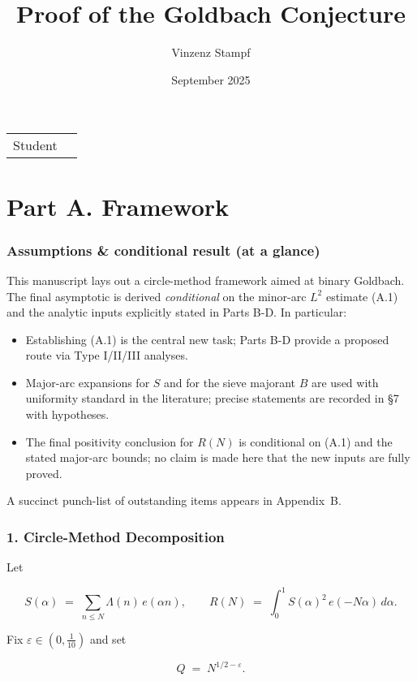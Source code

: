 \documentclass[11pt]{article}
\title{Proof of the Goldbach Conjecture}
\author{Vinzenz Stampf}
\date{September 2025}
\makeatletter
\theoremstyle{definition}
\theoremstyle{remark}
\providecommand{\theauthor}{\@author}
\makeatother
\begin{document}
\maketitle

\noindent\begin{tabular}{@{}ll}
    Student & \theauthor\\
\end{tabular}

\part*{Part A. Framework}

\section*{Assumptions \& conditional result (at a glance)}

This manuscript lays out a circle-method framework aimed at binary Goldbach. The final asymptotic is derived \emph{conditional} on the minor-arc $L^2$ estimate (A.1) and the analytic inputs explicitly stated in Parts B-D. In particular:

\begin{itemize}
  \item Establishing (A.1) is the central new task; Parts B-D provide a proposed route via Type I/II/III analyses.
  \item Major-arc expansions for $S$ and for the sieve majorant $B$ are used with uniformity standard in the literature; precise statements are recorded in §7 with hypotheses.
  \item The final positivity conclusion for $R(N)$ is conditional on (A.1) and the stated major-arc bounds; no claim is made here that the new inputs are fully proved.
\end{itemize}

A succinct punch-list of outstanding items appears in Appendix~B.

\section*{1. Circle-Method Decomposition}

Let

$$
S(\alpha)\;=\;\sum_{n\le N}\Lambda(n)\,e(\alpha n),\qquad
R(N)\;=\;\int_{0}^{1} S(\alpha)^2\,e(-N\alpha)\,d\alpha .
$$

Fix $\varepsilon\in (0,\tfrac1{10})$ and set

$$
Q \;=\; N^{1/2-\varepsilon}.
$$
\end{document}
